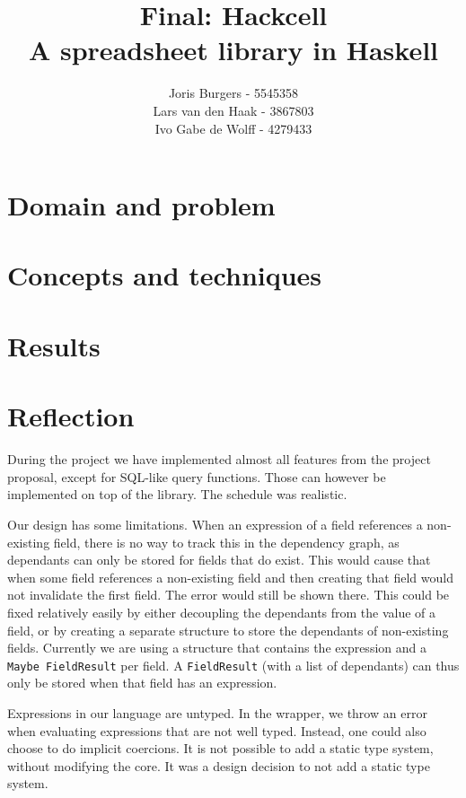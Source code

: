 \documentclass{article}
\title{
	Final: Hackcell \\
	\vskip 0.5cm
	\large{A spreadsheet library in Haskell}
}
\author{Joris Burgers - 5545358\\ Lars van den Haak - 3867803\\ Ivo Gabe de Wolff - 4279433}
\begin{document}
	\maketitle
	
	\section{Domain and problem}
	
	\section{Concepts and techniques}
	
	\section{Results}
	
	\section{Reflection}
	During the project we have implemented almost all features from the project proposal, except for SQL-like query functions. Those can however be implemented on top of the library. The schedule was realistic.
	
	Our design has some limitations. When an expression of a field references a non-existing field, there is no way to track this in the dependency graph, as dependants can only be stored for fields that do exist. This would cause that when some field references a non-existing field and then creating that field would not invalidate the first field. The error would still be shown there. This could be fixed relatively easily by either decoupling the dependants from the value of a field, or by creating a separate structure to store the dependants of non-existing fields. Currently we are using a structure that contains the expression and a \texttt{Maybe FieldResult} per field. A \texttt{FieldResult} (with a list of dependants) can thus only be stored when that field has an expression.
	
	Expressions in our language are untyped. In the wrapper, we throw an error when evaluating expressions that are not well typed. Instead, one could also choose to do implicit coercions. It is not possible to add a static type system, without modifying the core. It was a design decision to not add a static type system.
	
\end{document}
